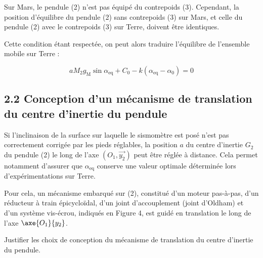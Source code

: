 Sur Mars, le pendule (2) n'est pas équipé du contrepoids (3). Cependant, la position d'équilibre du pendule (2) sans contrepoids (3) sur Mars, et celle du pendule (2) avec le contrepoids (3) sur Terre, doivent être identiques.


Cette condition étant respectée, on peut alors traduire l'équilibre de l'ensemble mobile sur Terre :


$$
a M_{2} g_{\mathrm{M}} \sin \alpha_{\mathrm{eq}}+C_{0}-k\left(\alpha_{\mathrm{eq}}-\alpha_{0}\right)=0 %
$$


\subsection*{2.2 Conception d'un mécanisme de translation du centre d'inertie du pendule}
Si l'inclinaison de la surface sur laquelle le sismomètre est posé n'est pas correctement corrigée par les pieds réglables, la position $a$ du centre d'inertie $G_{2}$ du pendule (2) le long de l'axe $\left(O_{1}, \overrightarrow{y_{2}}\right)$ peut être réglée à distance. Cela permet notamment d'assurer que $\alpha_{\mathrm{eq}}$ conserve une valeur optimale déterminée lors d'expérimentations sur Terre.

Pour cela, un mécanisme embarqué sur (2), constitué d'un moteur pas-à-pas, d'un réducteur à train épicycloïdal, d'un joint d'accouplement (joint d'Oldham) et d'un système vis-écrou, indiqués en Figure 4, est guidé en translation le long de l'axe  $\axe{O_1}{y_2}$.

\begin{obj}
Justifier les choix de conception du mécanisme de translation du centre d'inertie du pendule.
\end{obj}





